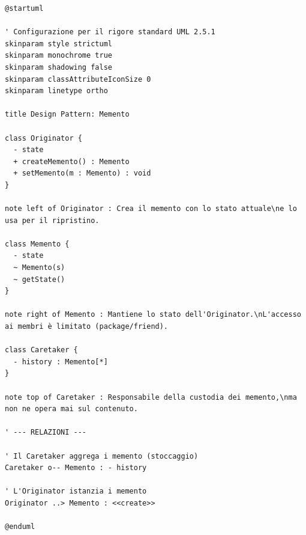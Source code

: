 \begin{verbatim}
@startuml

' Configurazione per il rigore standard UML 2.5.1
skinparam style strictuml
skinparam monochrome true
skinparam shadowing false
skinparam classAttributeIconSize 0
skinparam linetype ortho

title Design Pattern: Memento

class Originator {
  - state
  + createMemento() : Memento
  + setMemento(m : Memento) : void
}

note left of Originator : Crea il memento con lo stato attuale\ne lo usa per il ripristino.

class Memento {
  - state
  ~ Memento(s)
  ~ getState()
}

note right of Memento : Mantiene lo stato dell'Originator.\nL'accesso ai membri è limitato (package/friend).

class Caretaker {
  - history : Memento[*]
}

note top of Caretaker : Responsabile della custodia dei memento,\nma non ne opera mai sul contenuto.

' --- RELAZIONI ---

' Il Caretaker aggrega i memento (stoccaggio)
Caretaker o-- Memento : - history

' L'Originator istanzia i memento
Originator ..> Memento : <<create>>

@enduml

\end{verbatim}